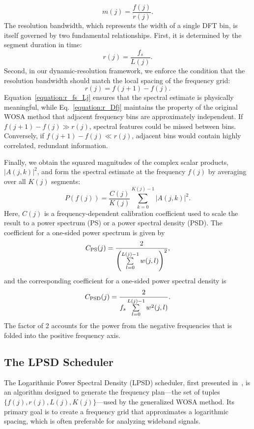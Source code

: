 \documentclass[final, 5p, times, twocolumn, number, sort&compress]{elsarticle}
\begin{document}
\begin{equation}
m(j) = \frac{f(j)}{r(j)}.
\label{equation:bin-number}
\end{equation}
The resolution bandwidth, which represents the width of a single DFT bin, is itself governed by two fundamental relationships. First, it is determined by the segment duration in time:
\begin{equation}
r(j) = \frac{f_s}{L(j)}.
\label{equation:r_fs_Lj}
\end{equation}
Second, in our dynamic-resolution framework, we enforce the condition that the resolution bandwidth should match the local spacing of the frequency grid:
\begin{equation}
r(j) = f(j + 1) - f(j).
\label{equation:r_Dfj}
\end{equation}
Equation~\ref{equation:r_fs_Lj} ensures that the spectral estimate is physically meaningful, while Eq.~\ref{equation:r_Dfj} maintains the property of the original WOSA method that adjacent frequency bins are approximately independent. If $f(j+1)-f(j) \gg r(j)$, spectral features could be missed between bins. Conversely, if $f(j+1) - f(j) \ll r(j)$, adjacent bins would contain highly correlated, redundant information.

Finally, we obtain the squared magnitudes of the complex scalar products, $|A(j,k)|^2$, and form the spectral estimate at the frequency $f(j)$ by averaging over all $K(j)$ segments:
\begin{equation}
P(f(j)) = \frac{C(j)}{K(j)} \sum \limits_{k=0}^{K(j)-1} |A(j,k)|^2.
\end{equation}
Here, $C(j)$ is a frequency-dependent calibration coefficient used to scale the result to a power spectrum (PS) or a power spectral density (PSD). The coefficient for a one-sided power spectrum is given by
\begin{equation}
C_{\rm PS} (j) = \frac{2}{\left( \sum\limits_{l=0}^{L(j)-1} w(j,l) \right)^{2}},
\end{equation}
and the corresponding coefficient for a one-sided power spectral density is
\begin{equation}
C_{\rm PSD} (j) = \frac{2}{f_s \sum\limits_{l=0}^{L(j)-1} w^2(j,l)}.
\end{equation}
The factor of 2 accounts for the power from the negative frequencies that is folded into the positive frequency axis.

\subsection{The LPSD Scheduler}
\label{sec:lpsd}
The Logarithmic Power Spectral Density (LPSD) scheduler, first presented in~\cite{Troebs2006}, is an algorithm designed to generate the frequency plan---the set of tuples $\{f(j), r(j), L(j), K(j)\}$---used by the generalized WOSA method. Its primary goal is to create a frequency grid that approximates a logarithmic spacing, which is often preferable for analyzing wideband signals.
\end{document}
